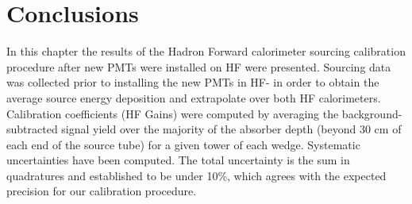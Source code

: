\section{Conclusions}
In this chapter the results of the Hadron Forward calorimeter sourcing calibration procedure after new PMTs were installed on HF were presented. Sourcing data was collected prior to installing the new PMTs in HF- in order to obtain the average source energy deposition and extrapolate over both HF calorimeters. Calibration coefficients (HF Gains) were computed by averaging the background-subtracted signal yield over the majority of the absorber depth (beyond 30 cm of each end of the source tube) for a given tower of each wedge. Systematic uncertainties have been computed. The total uncertainty is the sum in quadratures and established to be under 10\%, which agrees with the expected precision for our calibration procedure.